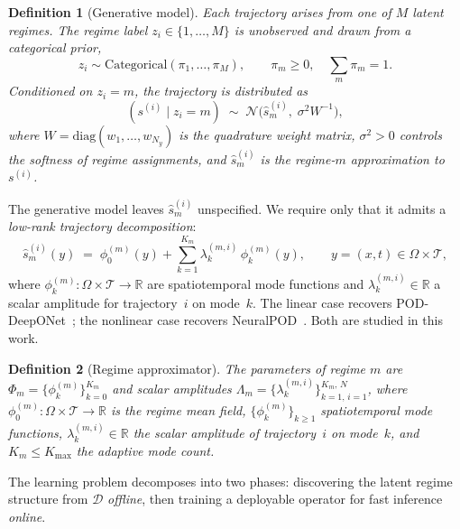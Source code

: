 \documentclass[preprint,10pt]{elsarticle}
\newtheorem{definition}{Definition}
\newcommand{\cN}{\mathcal{N}}
\newcommand{\cD}{\mathcal{D}}
\newcommand{\hats}{\hat{s}}
\begin{document}
\begin{definition}[Generative model]
\label{def:generative}
Each trajectory arises from one of $M$ latent regimes. The regime label $z_i \in \{1,\ldots,M\}$ is unobserved and drawn from a categorical prior,
\begin{equation}
  z_i \sim \mathrm{Categorical}(\pi_1,\ldots,\pi_M),
  \qquad \pi_m \geq 0,\quad \textstyle\sum_m \pi_m = 1.
  \label{eq:prior}
\end{equation}
Conditioned on $z_i = m$, the trajectory is distributed as
\begin{equation}
 ( s^{(i)} \mid z_i{=}m) \;\sim\;
  \cN\!\bigl(\hats_m^{(i)},\;\sigma^2 W^{-1}\bigr),
  \label{eq:likelihood}
\end{equation}
where $W = \mathrm{diag}(w_1,\ldots,w_{N_y})$ is the quadrature weight matrix, $\sigma^2 > 0$ controls the softness of regime assignments, and $\hats_m^{(i)}$ is the regime-$m$ approximation to $s^{(i)}$.
\end{definition}


The generative model leaves $\hats_m^{(i)}$ unspecified. We require only that it admits a \emph{low-rank trajectory decomposition}:
\begin{equation}
  \hats_m^{(i)}(y)
  \;=\; \phi_0^{(m)}(y)
  + \sum_{k=1}^{K_m}
    \lambda_k^{(m,i)}\,\phi_k^{(m)}(y),
  \qquad y = (x,t) \in \Omega\times\mathcal{T},
  \label{eq:separable}
\end{equation}
where $\phi_k^{(m)} : \Omega\times\mathcal{T}\to\mathbb{R}$ are spatiotemporal
mode functions and $\lambda_k^{(m,i)} \in \mathbb{R}$ a scalar amplitude
for trajectory~$i$ on mode~$k$.
The linear case recovers POD-DeepONet~\citep{Lu2022}; the nonlinear case recovers NeuralPOD~\citep{Mou2026}. Both are studied in this work.

\begin{definition}[Regime approximator]
\label{def:approx}
The parameters of regime $m$ are
$\Phi_m = \{\phi_k^{(m)}\}_{k=0}^{K_m}$
and scalar amplitudes
$\Lambda_m = \{\lambda_k^{(m,i)}\}_{k=1,\,i=1}^{K_m,\,N}$,
where $\phi_0^{(m)} : \Omega\times\mathcal{T}\to\mathbb{R}$ is the regime mean field,
$\{\phi_k^{(m)}\}_{k \geq 1}$ spatiotemporal mode functions,
$\lambda_k^{(m,i)}\in\mathbb{R}$ the scalar amplitude of trajectory~$i$ on mode~$k$,
and $K_m \leq K_{\max}$ the adaptive mode count.
\end{definition}

The learning problem decomposes into two phases: discovering the latent regime structure from $\cD$ \emph{offline}, then training a deployable operator for fast inference \emph{online}.
\end{document}
